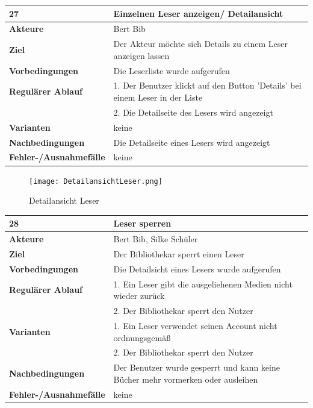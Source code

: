 \documentclass[fontsize=12pt,paper=a4,twoside]{scrartcl}
\begin{document}
\begin{table}
	[H] \label{27} 
	\begin{tabular}
		{|l|p{10cm}|} \hline \textbf{27} & \textbf{Einzelnen Leser anzeigen/ Detailansicht} \\
		\hline \textbf{Akteure} & Bert Bib\\
		\hline \textbf{Ziel} & Der Akteur möchte sich Details zu einem Leser anzeigen lassen \\
		\hline \textbf{Vorbedingungen} & Die Leserliste wurde aufgerufen \\
		\hline \textbf{Regulärer Ablauf} & 1. Der Benutzer klickt auf den Button 'Details' bei einem Leser in der Liste \\
		&2. Die Detailseite des Lesers wird angezeigt\\
		\hline \textbf{Varianten} & keine \\
		\hline \textbf{Nachbedingungen} & Die Detailseite eines Lesers wird angezeigt\\
		\hline \textbf{Fehler-/Ausnahmefälle} & keine\\
		\hline 
	\end{tabular}
\end{table}
\begin{figure}
	[H] \caption{Detailansicht Leser} 
	\texttt{[image: DetailansichtLeser.png]} \label{pic:LeserDetailans.} 
\end{figure}
\begin{table}
	[H] \label{28} 
	\begin{tabular}
		{|l|p{10cm}|} \hline \textbf{28} & \textbf{Leser sperren} \\
		\hline \textbf{Akteure} & Bert Bib, Silke Schüler\\
		\hline \textbf{Ziel} & Der Bibliothekar sperrt einen Leser \\
		\hline \textbf{Vorbedingungen} & Die Detailsicht eines Lesers wurde aufgerufen \\
		\hline \textbf{Regulärer Ablauf} & 1. Ein Leser gibt die ausgeliehenen Medien nicht wieder zurück\\
		&2. Der Bibliothekar sperrt den Nutzer\\
		\hline \textbf{Varianten} & 1. Ein Leser verwendet seinen Account nicht ordnungsgemäß\\
		&2. Der Bibliothekar sperrt den Nutzer\\
		\hline \textbf{Nachbedingungen} & Der Benutzer wurde gesperrt und kann keine Bücher mehr vormerken oder ausleihen\\
		\hline \textbf{Fehler-/Ausnahmefälle} & keine\\
		\hline 
	\end{tabular}
\end{table}
\end{document}

